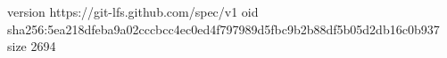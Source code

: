 version https://git-lfs.github.com/spec/v1
oid sha256:5ea218dfeba9a02cccbcc4ec0ed4f797989d5fbc9b2b88df5b05d2db16c0b937
size 2694

